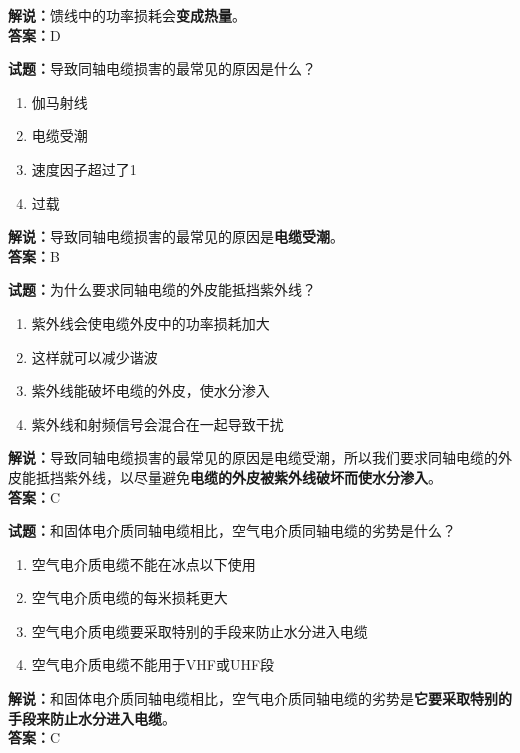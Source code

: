 \documentclass{ctexbook}
\begin{document}
\noindent\textbf{解说：}馈线中的功率损耗会\textbf{变成热量}。\\\noindent\textbf{答案：}D

\bigskip

\noindent\textbf{试题：}导致同轴电缆损害的最常见的原因是什么？

\begin{enumerate}[leftmargin=3em]
  \item 伽马射线
  \item 电缆受潮
  \item 速度因子超过了1
  \item 过载
\end{enumerate}

\noindent\textbf{解说：}导致同轴电缆损害的最常见的原因是\textbf{电缆受潮}。\\\noindent\textbf{答案：}B

\bigskip

\noindent\textbf{试题：}为什么要求同轴电缆的外皮能抵挡紫外线？

\begin{enumerate}[leftmargin=3em]

  \item 紫外线会使电缆外皮中的功率损耗加大
  \item 这样就可以减少谐波
  \item 紫外线能破坏电缆的外皮，使水分渗入
  \item 紫外线和射频信号会混合在一起导致干扰
\end{enumerate}

\noindent\textbf{解说：}导致同轴电缆损害的最常见的原因是电缆受潮，所以我们要求同轴电缆的外皮能抵挡紫外线，以尽量避免\textbf{电缆的外皮被紫外线破坏而使水分渗入}。\\\noindent\textbf{答案：}C

\bigskip

\noindent\textbf{试题：}和固体电介质同轴电缆相比，空气电介质同轴电缆的劣势是什么？

\begin{enumerate}[leftmargin=3em]
  \item 空气电介质电缆不能在冰点以下使用
  \item 空气电介质电缆的每米损耗更大
  \item 空气电介质电缆要采取特别的手段来防止水分进入电缆
  \item 空气电介质电缆不能用于VHF或UHF段
\end{enumerate}

\noindent\textbf{解说：}和固体电介质同轴电缆相比，空气电介质同轴电缆的劣势是\textbf{它要采取特别的手段来防止水分进入电缆}。\\\noindent\textbf{答案：}C%
\end{document}
